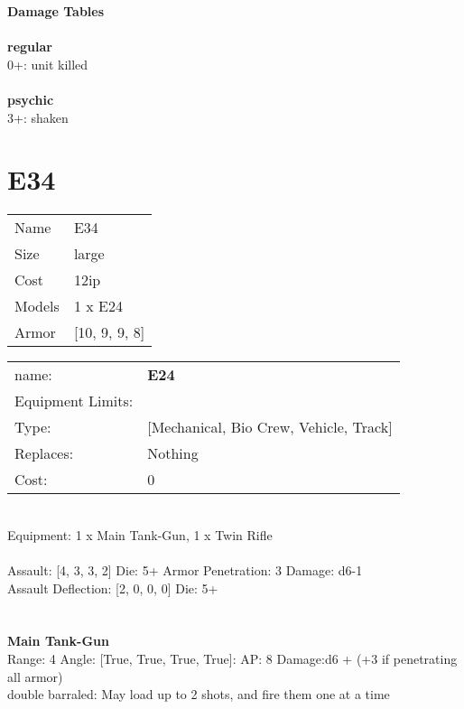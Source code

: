 {\bf Damage Tables} \\
\ \\ {\bf regular } \\
0+: unit killed \\
\ \\ {\bf psychic } \\
3+: shaken \\










\pagebreak\pagebreak

\section{ E34 }

\begin{tabular}{ll}
  Name & E34 \\
  Size & large\\
  Cost & 12ip\\
  Models & 1 x E24\\
  Armor & [10, 9, 9, 8]\\
\end{tabular}

\noindent 

\noindent
\begin{tabular}{ll}
name: &{\bf E24 } \\
Equipment Limits: & \\
Type: &[Mechanical, Bio Crew, Vehicle, Track] \\
Replaces: &Nothing \\
Cost: & 0\\
\end{tabular}
\ \\
Equipment: 1 x Main Tank-Gun, 1 x Twin Rifle \\
\ \\
Assault: [4, 3, 3, 2] Die: 5+ Armor Penetration: 3 Damage: d6-1 \\
Assault Deflection: [2, 0, 0, 0] Die: 5+\\
\indent  
\ \\

\ \\
{\bf Main Tank-Gun } \\



Range: 4  Angle: [True, True, True, True]: AP: 8 Damage:d6 + (+3 if penetrating all armor) \\
double barraled: May load up to 2 shots, and fire them one at a time\\ 




